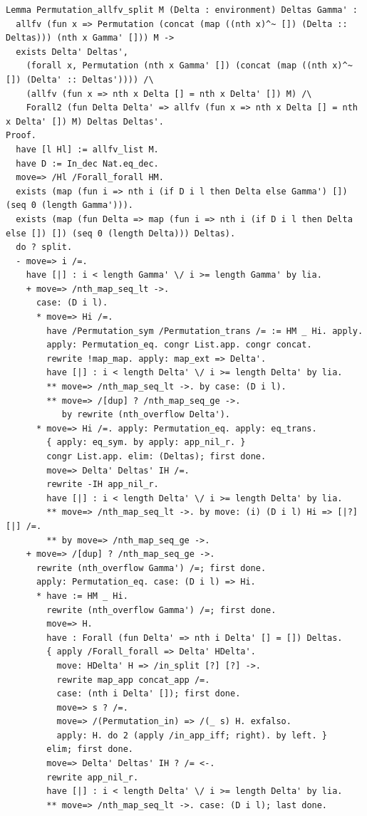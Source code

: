 \begin{lstlisting}[style=authorcoq]
Lemma Permutation_allfv_split M (Delta : environment) Deltas Gamma' :
  allfv (fun x => Permutation (concat (map ((nth x)^~ []) (Delta :: Deltas))) (nth x Gamma' [])) M ->
  exists Delta' Deltas',
    (forall x, Permutation (nth x Gamma' []) (concat (map ((nth x)^~ []) (Delta' :: Deltas')))) /\
    (allfv (fun x => nth x Delta [] = nth x Delta' []) M) /\
    Forall2 (fun Delta Delta' => allfv (fun x => nth x Delta [] = nth x Delta' []) M) Deltas Deltas'.
Proof.
  have [l Hl] := allfv_list M.
  have D := In_dec Nat.eq_dec.
  move=> /Hl /Forall_forall HM.
  exists (map (fun i => nth i (if D i l then Delta else Gamma') []) (seq 0 (length Gamma'))).
  exists (map (fun Delta => map (fun i => nth i (if D i l then Delta else []) []) (seq 0 (length Delta))) Deltas).
  do ? split.
  - move=> i /=.
    have [|] : i < length Gamma' \/ i >= length Gamma' by lia.
    + move=> /nth_map_seq_lt ->.
      case: (D i l).
      * move=> Hi /=.
        have /Permutation_sym /Permutation_trans /= := HM _ Hi. apply.
        apply: Permutation_eq. congr List.app. congr concat.
        rewrite !map_map. apply: map_ext => Delta'.
        have [|] : i < length Delta' \/ i >= length Delta' by lia.
        ** move=> /nth_map_seq_lt ->. by case: (D i l).
        ** move=> /[dup] ? /nth_map_seq_ge ->.
           by rewrite (nth_overflow Delta').
      * move=> Hi /=. apply: Permutation_eq. apply: eq_trans.
        { apply: eq_sym. by apply: app_nil_r. }
        congr List.app. elim: (Deltas); first done.
        move=> Delta' Deltas' IH /=.
        rewrite -IH app_nil_r.
        have [|] : i < length Delta' \/ i >= length Delta' by lia.
        ** move=> /nth_map_seq_lt ->. by move: (i) (D i l) Hi => [|?] [|] /=.
        ** by move=> /nth_map_seq_ge ->.
    + move=> /[dup] ? /nth_map_seq_ge ->.
      rewrite (nth_overflow Gamma') /=; first done.
      apply: Permutation_eq. case: (D i l) => Hi.
      * have := HM _ Hi.
        rewrite (nth_overflow Gamma') /=; first done.
        move=> H.
        have : Forall (fun Delta' => nth i Delta' [] = []) Deltas.
        { apply /Forall_forall => Delta' HDelta'.
          move: HDelta' H => /in_split [?] [?] ->.
          rewrite map_app concat_app /=.
          case: (nth i Delta' []); first done.
          move=> s ? /=.
          move=> /(Permutation_in) => /(_ s) H. exfalso.
          apply: H. do 2 (apply /in_app_iff; right). by left. }
        elim; first done.
        move=> Delta' Deltas' IH ? /= <-.
        rewrite app_nil_r.
        have [|] : i < length Delta' \/ i >= length Delta' by lia.
        ** move=> /nth_map_seq_lt ->. case: (D i l); last done.

\end{lstlisting}
